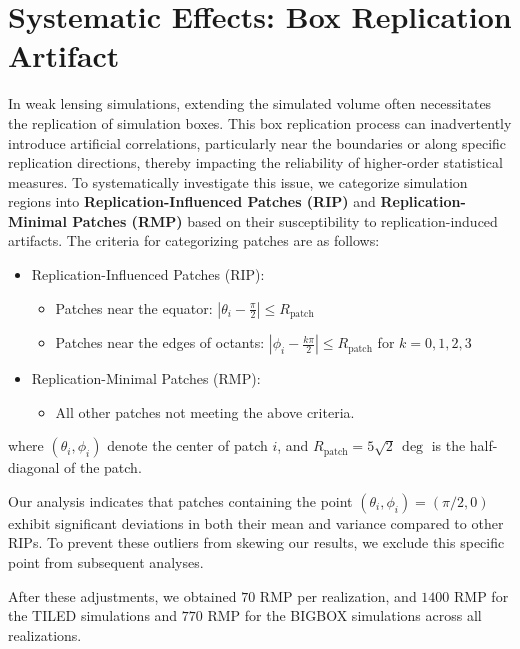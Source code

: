 \clearpage

\section{Systematic Effects: Box Replication Artifact} \label{sec:boxreplication}
In weak lensing simulations, extending the simulated volume often necessitates the replication of simulation boxes. This box replication process can inadvertently introduce artificial correlations, particularly near the boundaries or along specific replication directions, thereby impacting the reliability of higher-order statistical measures. To systematically investigate this issue, we categorize simulation regions into \textbf{Replication-Influenced Patches (RIP)} and \textbf{Replication-Minimal Patches (RMP)} based on their susceptibility to replication-induced artifacts.
The criteria for categorizing patches are as follows:
\begin{itemize} 
    \item Replication-Influenced Patches (RIP):
    \begin{itemize}
        \item Patches near the equator: $ \left| \theta_i - \frac{\pi}{2} \right| \leq R_{\text{patch}} $ 
        \item Patches near the edges of octants: $ \left| \phi_i - \frac{k\pi}{2} \right| \leq R_{\text{patch}} $ for $k = 0, 1, 2, 3$
    \end{itemize}
    \item Replication-Minimal Patches (RMP):
    \begin{itemize}
        \item All other patches not meeting the above criteria.
    \end{itemize}
\end{itemize}
where $(\theta_i, \phi_i)$ denote the center of patch $i$, and $R_{\text{patch}} = 5\sqrt{2}\, \mathrm{\deg}$ is the half-diagonal of the patch.

Our analysis indicates that patches containing the point $(\theta_i, \phi_i) = (\pi/2, 0)$ exhibit significant deviations in both their mean and variance compared to other RIPs. To prevent these outliers from skewing our results, we exclude this specific point from subsequent analyses.

After these adjustments, we obtained $70$ RMP per realization, and $1400$ RMP for the TILED simulations and $770$ RMP for the BIGBOX simulations across all realizations.

